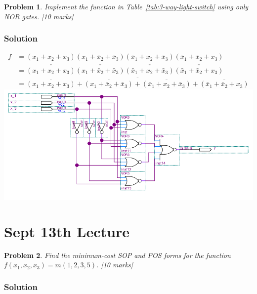 \documentclass[twocolumn]{article}
\newtheorem{prob}{Problem}
\newcommand{\bx}{\bar{x}}
\begin{document}
\begin{prob}
 Implement the function in Table~\ref{tab:3-way-light-switch} using only NOR
 gates. [10 marks]
\end{prob}
\subsubsection*{Solution}
{\tiny
\begin{align*}
  f &= (x_1 + x_2 + x_3)(x_1 + \bx_2 + \bx_3)(\bx_1 + x_2 + \bx_3)(\bx_1 + \bx_2 + x_3)
      \\
    &=\overline{\overline{(x_1 + x_2 + x_3)}}\overline{\overline{(x_1 + \bx_2 + \bx_3)}}\overline{\overline{(\bx_1 + x_2 + \bx_3)}}\overline{\overline{(\bx_1 + \bx_2 + x_3)}}
      \\
    &=\overline{\overline{{(x_1 + x_2 + x_3)}} + {\overline{(x_1 + \bx_2 + \bx_3)}} + {\overline{(\bx_1 + x_2 + \bx_3)}} + {\overline{(\bx_1 + \bx_2 + x_3)}}}
\end{align*}
}
\includegraphics[width=\linewidth]{files/hw2p4.png}

\section{Sept 13th Lecture}

\begin{prob}
Find the minimum-cost SOP and POS forms for the function $f(x_1 , x_2 , x_3 ) =
m(1, 2, 3, 5)$. \cite[Prob 2.37]{brown2013fundamentals} [10 marks]
\label{prob:237}
\end{prob}

\subsubsection*{Solution}
\end{document}
